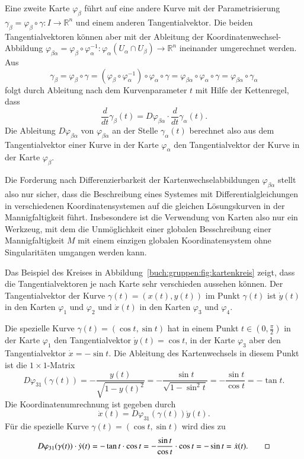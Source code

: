 Eine zweite Karte $\varphi_\beta$ führt auf eine andere Kurve
mit der Parametrisierung
$\gamma_\beta=\varphi_\beta\circ\gamma\colon I \to \mathbb{R}^n$ 
und einem anderen Tangentialvektor.
Die beiden Tangentialvektoren können aber mit der Ableitung der
Koordinatenwechsel-Abbildung
$\varphi_{\beta\alpha}=\varphi_\beta\circ\varphi_\alpha^{-1}\colon
\varphi_\alpha(U_\alpha\cap U_\beta)\to \mathbb{R}^n$
ineinander umgerechnet werden.
Aus
\[
\gamma_\beta
=
\varphi_\beta\circ \gamma
=
(
\varphi_\beta
\circ
\varphi_\alpha^{-1}
)
\circ
\varphi_\alpha\circ\gamma
=
\varphi_{\beta\alpha}
\circ
\varphi_\alpha\circ\gamma
=
\varphi_{\beta\alpha}\circ\gamma_\alpha
\]
folgt durch Ableitung nach dem Kurvenparameter $t$ mit Hilfe der
Kettenregel, dass
\[
\frac{d}{dt}\gamma_\beta(t)
=
D\varphi_{\beta\alpha}
\cdot
\frac{d}{dt}\gamma_\alpha(t).
\]
Die Ableitung $D\varphi_{\beta\alpha}$ von $\varphi_{\beta\alpha}$ 
an der Stelle $\gamma_\alpha(t)$ berechnet also aus dem Tangentialvektor
einer Kurve in der Karte $\varphi_\alpha$ den Tangentialvektor der
Kurve in der Karte $\varphi_\beta$.

Die Forderung nach Differenzierbarkeit der Kartenwechselabbildungen
$\varphi_{\beta\alpha}$ stellt also nur sicher, dass die Beschreibung
eines Systemes mit Differentialgleichungen in verschiedenen
Koordinatensystemen auf die gleichen Lösungskurven in der
Mannigfaltigkeit führt.
Insbesondere ist die Verwendung von Karten also nur ein Werkzeug,
mit dem die Unmöglichkeit einer globalen Besschreibung einer
Mannigfaltigkeit $M$ mit einem einzigen globalen Koordinatensystem
ohne Singularitäten umgangen werden kann.

\begin{beispiel}
Das Beispiel des Kreises in Abbildung~\ref{buch:gruppen:fig:kartenkreis}
zeigt, dass die Tangentialvektoren je nach Karte sehr verschieden
aussehen können.
Der Tangentialvektor der Kurve $\gamma(t) = (x(t), y(t))$ im Punkt
$\gamma(t)$ ist $\dot{y}(t)$ in den Karten $\varphi_1$ und $\varphi_2$ 
und $\dot{x}(t)$ in den Karten $\varphi_3$ und $\varphi_4$.

Die spezielle Kurve $\gamma(t) = (\cos t,\sin t)$ hat in einem Punkt
$t\in (0,\frac{\pi}2)$
in der Karte $\varphi_1$ den Tangentialvektor $\dot{y}(t)=\cos t$,
in der Karte $\varphi_3$ aber den Tangentialvektor $\dot{x}=-\sin t$.
Die Ableitung des Kartenwechsels in diesem Punkt ist die $1\times 1$-Matrix
\[
D\varphi_{31}(\gamma(t))
=
-\frac{y(t)}{\sqrt{1-y(t)^2}}
=
-\frac{\sin t}{\sqrt{1-\sin^2 t}}
=
-\frac{\sin t}{\cos t}
=
-\tan t.
\]
Die Koordinatenumrechnung ist gegeben durch
\[
\dot{x}(t)
=
D\varphi_{31}(\gamma(t)) 
\dot{y}(t).
\]
Für die spezielle Kurve $\gamma(t)=(\cos t,\sin t)$ wird dies zu
\[
D\varphi_{31}(\gamma(t)) 
\cdot
\dot{y}(t)
=
-\tan t\cdot \cos t
=
-\frac{\sin t}{\cos t}\cdot \cos t
=
-\sin t
=
\dot{x}(t).
\qedhere
\]
\end{beispiel}

